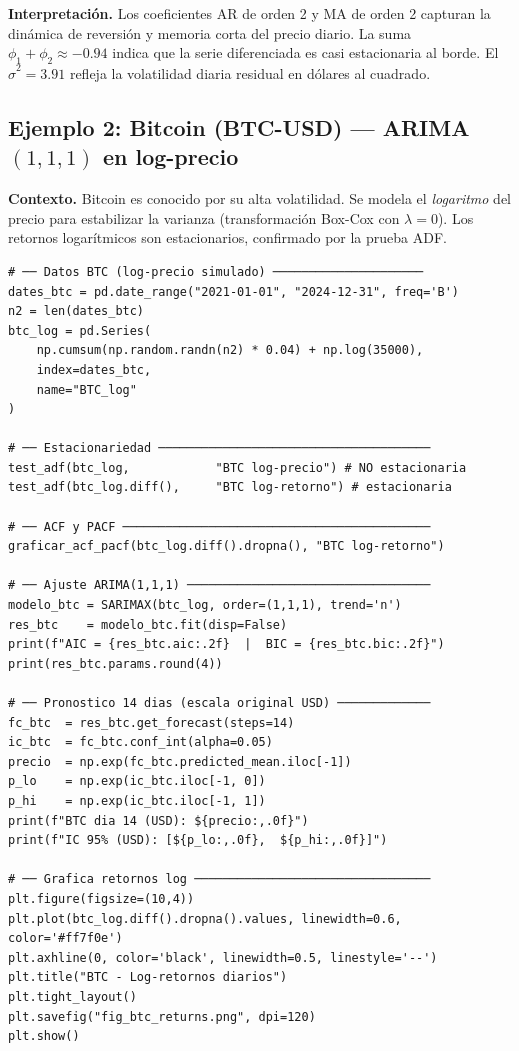 \documentclass[12pt,a4paper]{article}
\begin{document}
\textbf{Interpretación.} Los coeficientes AR de orden 2 y MA de orden 2 capturan la
dinámica de reversión y memoria corta del precio diario. La suma $\phi_1+\phi_2 \approx -0.94$
indica que la serie diferenciada es casi estacionaria al borde. El $\hat{\sigma}^2 = 3.91$
refleja la volatilidad diaria residual en dólares al cuadrado.

\subsection{Ejemplo 2: Bitcoin (BTC-USD) --- ARIMA$(1,1,1)$ en log-precio}

\textbf{Contexto.} Bitcoin es conocido por su alta volatilidad. Se modela el
\emph{logaritmo} del precio para estabilizar la varianza (transformación Box-Cox con
$\lambda=0$). Los retornos logarítmicos son estacionarios, confirmado por la prueba ADF.

\begin{lstlisting}[caption={Ejemplo 2 --- ARIMA$(1,1,1)$ para BTC en log-precio}]
# ── Datos BTC (log-precio simulado) ─────────────────────
dates_btc = pd.date_range("2021-01-01", "2024-12-31", freq='B')
n2 = len(dates_btc)
btc_log = pd.Series(
    np.cumsum(np.random.randn(n2) * 0.04) + np.log(35000),
    index=dates_btc,
    name="BTC_log"
)

# ── Estacionariedad ──────────────────────────────────────
test_adf(btc_log,            "BTC log-precio") # NO estacionaria
test_adf(btc_log.diff(),     "BTC log-retorno") # estacionaria

# ── ACF y PACF ───────────────────────────────────────────
graficar_acf_pacf(btc_log.diff().dropna(), "BTC log-retorno")

# ── Ajuste ARIMA(1,1,1) ──────────────────────────────────
modelo_btc = SARIMAX(btc_log, order=(1,1,1), trend='n')
res_btc    = modelo_btc.fit(disp=False)
print(f"AIC = {res_btc.aic:.2f}  |  BIC = {res_btc.bic:.2f}")
print(res_btc.params.round(4))

# ── Pronostico 14 dias (escala original USD) ─────────────
fc_btc  = res_btc.get_forecast(steps=14)
ic_btc  = fc_btc.conf_int(alpha=0.05)
precio  = np.exp(fc_btc.predicted_mean.iloc[-1])
p_lo    = np.exp(ic_btc.iloc[-1, 0])
p_hi    = np.exp(ic_btc.iloc[-1, 1])
print(f"BTC dia 14 (USD): ${precio:,.0f}")
print(f"IC 95% (USD): [${p_lo:,.0f},  ${p_hi:,.0f}]")

# ── Grafica retornos log ─────────────────────────────────
plt.figure(figsize=(10,4))
plt.plot(btc_log.diff().dropna().values, linewidth=0.6, color='#ff7f0e')
plt.axhline(0, color='black', linewidth=0.5, linestyle='--')
plt.title("BTC - Log-retornos diarios")
plt.tight_layout()
plt.savefig("fig_btc_returns.png", dpi=120)
plt.show()
\end{lstlisting}
\end{document}
